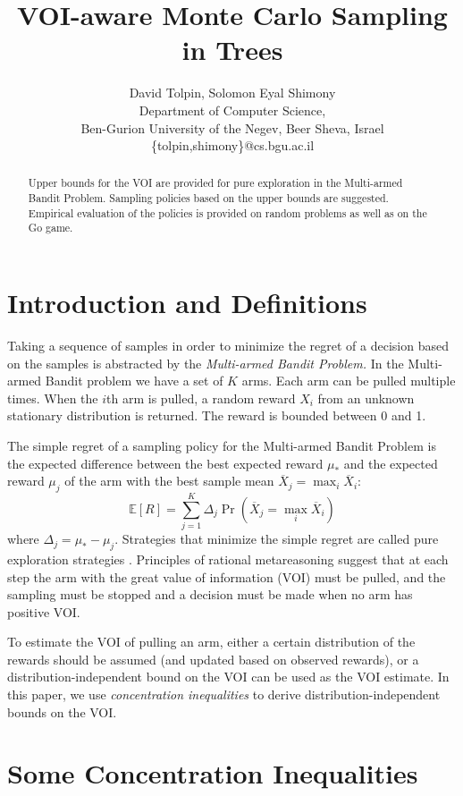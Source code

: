 \documentclass{article}
\title{VOI-aware Monte Carlo Sampling in Trees}
\author {David Tolpin, Solomon Eyal Shimony \\
Department of Computer Science, \\
Ben-Gurion University of the Negev, Beer Sheva, Israel \\
\{tolpin,shimony\}@cs.bgu.ac.il}
\newcommand {\IE} {\ensuremath {\mathbb{E}}}
\begin{document}
\maketitle

\begin{abstract}
Upper bounds for the VOI are provided for pure exploration in the
Multi-armed Bandit Problem. Sampling policies based on the upper
bounds are suggested. Empirical evaluation of the policies is provided
on random problems as well as on the Go game.
\end{abstract}


\section{Introduction and Definitions}

Taking a sequence of samples in order to minimize the
regret of a decision based on the samples is abstracted by the
{\em Multi-armed Bandit Problem.} In the Multi-armed Bandit problem
we have a set of $K$ arms. Each arm can be pulled multiple
times. When the $i$th arm is pulled, a random reward $X_i$ from an
unknown stationary distribution is returned.  The reward is bounded
between 0 and 1.

The simple regret of a sampling policy for the Multi-armed Bandit
Problem is the expected difference between the best expected reward
$\mu_*$ and the expected reward $\mu_j$ of the arm with the best sample mean
$\overline X_j=\max_i\overline X_i$:
\begin{equation}
\label{eqn:simple-regret}
\IE[R]=\sum_{j=1}^K\Delta_j\Pr(\overline X_j=\max_i\overline X_i)
\end{equation}
where $\Delta_j=\mu_*-\mu_j$.
Strategies that minimize the simple regret are called pure exploration
strategies \cite{Bubeck.pure}. Principles of rational metareasoning
\cite{Russell.right} suggest that at each step the arm with the great
value of information (VOI) must be pulled, and the sampling must be
stopped and a decision must be made when no arm has positive VOI. 

To estimate the VOI of pulling an arm, either a certain 
distribution of the rewards should be assumed (and updated based on
observed rewards), or a distribution-independent bound on the VOI can be
used as the VOI estimate. In this paper, we use {\em concentration inequalities}
to derive distribution-independent bounds on the VOI.

\section{Some Concentration Inequalities}
\end{document}
